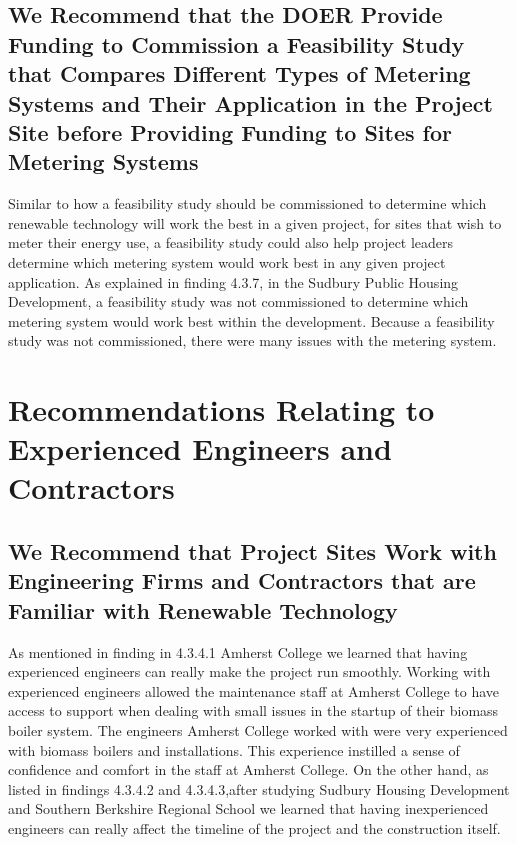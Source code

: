 \subsection{We Recommend that the DOER Provide Funding to Commission a Feasibility Study that Compares Different Types of Metering Systems and Their Application in the Project Site before Providing Funding to Sites for Metering Systems}
\par Similar to how a feasibility study should be commissioned to determine which renewable technology will work the best in a given project, for sites that wish to meter their energy use, a feasibility study could also help project leaders determine which metering system would work best in any given project application. As explained in finding 4.3.7, in the Sudbury Public Housing Development, a feasibility study was not commissioned to determine which metering system would work best within the development. Because a feasibility study was not commissioned, there were many issues with the metering system. 

\section{Recommendations Relating to Experienced Engineers and Contractors}
\subsection{We Recommend that Project Sites Work with Engineering Firms and Contractors that are Familiar with Renewable Technology}
\par As mentioned in finding in 4.3.4.1 Amherst College we learned that having experienced engineers can really make the project run smoothly. Working with experienced engineers allowed the maintenance staff at Amherst College to have access to support when dealing with small issues in the startup of their biomass boiler system. The engineers Amherst College worked with were very experienced with biomass boilers and installations. This experience instilled a sense of confidence and comfort in the staff at Amherst College. On the other hand, as listed in findings 4.3.4.2 and 4.3.4.3,after studying Sudbury Housing Development and Southern Berkshire Regional School we learned that having inexperienced engineers can really affect the timeline of the project and the construction itself. 

